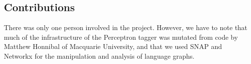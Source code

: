 \documentclass[12pt]{article}
\begin{document}

\subsection{Contributions}
There was only one person involved in the project. However, we have to note that much of the infrastructure of the Perceptron tagger was mutated from code by Matthew Honnibal of Macquarie University, and that we used SNAP and Networkx for the manipulation and analysis of language graphs. %

\end{document}
